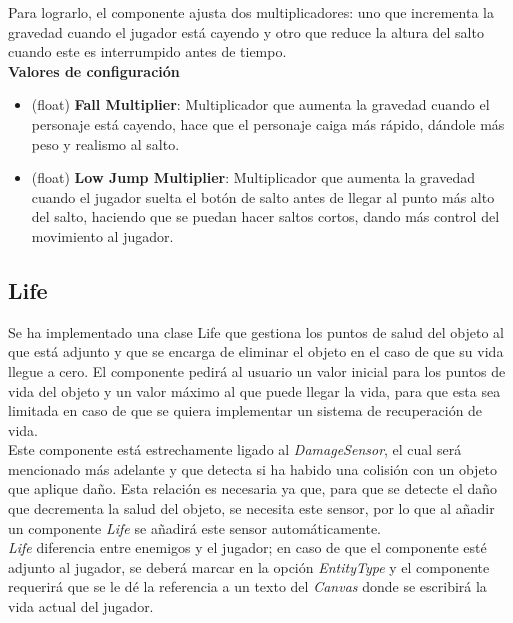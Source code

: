 Para lograrlo, el componente ajusta dos multiplicadores: uno que incrementa la gravedad cuando el jugador está cayendo y otro que reduce la altura del salto cuando este es interrumpido antes de tiempo.\\

\textbf{Valores de configuración}
\begin{itemize}
	\item (float) \textbf{Fall Multiplier}: Multiplicador que aumenta la gravedad cuando el personaje está cayendo, hace que el personaje caiga más rápido, dándole más peso y realismo al salto.
	\item (float) \textbf{Low Jump Multiplier}: Multiplicador que aumenta la gravedad cuando el jugador suelta el botón de salto antes de llegar al punto más alto del salto, haciendo que se puedan hacer saltos cortos, dando más control del movimiento al jugador.
\end{itemize}

\subsection{Life}

Se ha implementado una clase Life que gestiona los puntos de salud del objeto al que está adjunto y que se encarga de eliminar el objeto en el caso de que su vida llegue a cero. El componente pedirá al usuario un valor inicial para los puntos de vida del objeto y un valor máximo al que puede llegar la vida, para que esta sea limitada en caso de que se quiera implementar un sistema de recuperación de vida.\\

Este componente está estrechamente ligado al \textit{DamageSensor}, el cual será mencionado más adelante y que detecta si ha habido una colisión con un objeto que aplique daño. Esta relación es necesaria ya que, para que se detecte el daño que decrementa la salud del objeto, se necesita este sensor, por lo que al añadir un componente \textit{Life} se añadirá este sensor automáticamente.\\

\textit{Life} diferencia entre enemigos y el jugador; en caso de que el componente esté adjunto al jugador, se deberá marcar en la opción \textit{EntityType} y el componente requerirá que se le dé la referencia a un texto del \textit{Canvas} donde se escribirá la vida actual del jugador.\\

